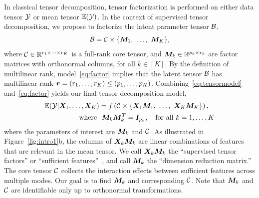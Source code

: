 \documentclass[12pt]{article}
\theoremstyle{plain}
\theoremstyle{definition}
\begin{document}
In classical tensor decomposition, tensor factorization is performed on either data tensor $\mathcal{Y}$ or mean tensor $\mathbb{E}(\mathcal{Y})$. In the context of supervised tensor decomposition, we propose to factorize the latent parameter tensor $\mathcal{B}$, 
\begin{equation}\label{eq:factor}
\mathcal{B}=\mathcal{C}\times\{\bm M_1,\ \ldots,\ \bm M_K\},
\end{equation}
where $\mathcal{C}\in\mathbb{R}^{r_1\times \cdots \times r_K}$ is a full-rank core tensor, and $\bm M_k\in\mathbb{R}^{p_k\times r_k}$ are factor matrices with orthonormal columns, for all $k\in[K]$. By the definition of multilinear rank, model~\eqref{eq:factor} implies that the latent tensor $\mathcal{B}$ has multilinear-rank $\bm{r}=(r_1,\ldots,r_K)\leq (p_1,\ldots,p_K)$. 
Combining~\eqref{eq:tensormodel} and~\eqref{eq:factor} yields our final tensor decomposition model,
\begin{align}\label{eq:decomp}
\mathbb{E}(\tY|\mX_1,\ldots,\mX_K) &= f\left(\tC\times\{\mX_1\mM_1,\ \ldots,\ \mX_K\mM_K\}\right),\\
\text{where} \ &\ \mM_k\mM^T_k=\mI_{p_k},\quad \text{for all }k=1,\ldots,K
\end{align}
where the parameters of interest are $\bm M_k$ and $\mathcal{C}$. As illustrated in Figure~\ref{fig:intro1}b, the columns of $\bm X_k\bm M_k$ are linear combinations of features that are relevant in the mean tensor. We call $\bm X_k\bm M_k$ the ``supervised tensor factors'' or ``sufficient features''~\citep{adragni2009sufficient}, and call $\bm M_k$ the ``dimension reduction matrix.'' The core tensor $\mathcal{C}$ collects the interaction effects between sufficient features across multiple modes. Our goal is to find $\bm M_k$ and corresponding $\mathcal{C}$. Note that $\bm M_k$ and $\mathcal{C}$ are identifiable only up to orthonormal transformations. 
\end{document}
